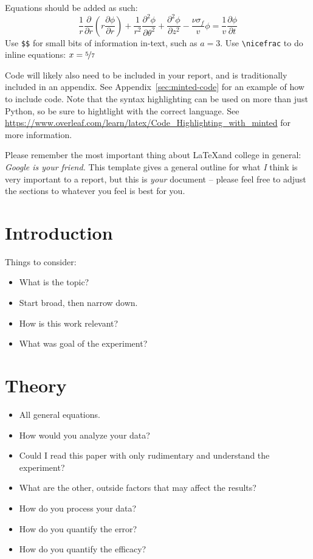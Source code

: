 \documentclass{juniorlabs}
\begin{document}
    Equations should be added as such:
    \begin{equation}
        \frac{1}{r}\frac{\partial}{\partial r}\left(r\frac{\partial\phi}{\partial r}\right) + \frac{1}{r^2}\frac{\partial^2\phi}{\partial\theta^2} + \frac{\partial^2\phi}{\partial z^2} - \frac{\nu\sigma_f}{v}\phi = \frac{1}{v}\frac{\partial\phi}{\partial t}
    \end{equation}
    Use \verb|$$| for small bits of information in-text, such as $a=3$.
    Use \verb|\nicefrac| to do inline equations: $x = \nicefrac{5}{7}$

    Code will likely also need to be included in your report, and is traditionally included in an appendix.
    See Appendix~\ref{sec:minted-code} for an example of how to include code.
    Note that the syntax highlighting can be used on more than just Python, so be sure to hightlight with the correct language.
    See \url{https://www.overleaf.com/learn/latex/Code_Highlighting_with_minted} for more information.

    Please remember the most important thing about \LaTeX and college in general: \emph{Google is your friend.}
    This template gives a general outline for what \emph{I} think is very important to a report, but this is \emph{your} document -- please feel free to adjust the sections to whatever you feel is best for you.


    \section{Introduction} \label{introduction}
    Things to consider:
    \begin{itemize}
        \item What is the topic?
        \item Start broad, then narrow down.
        \item How is this work relevant?
        \item What was goal of the experiment?
    \end{itemize}


    \section{Theory} \label{theory}
    \begin{itemize}
        \item All general equations.
        \item How would you analyze your data?
        \item Could I read this paper with only rudimentary and understand the experiment?
        \item What are the other, outside factors that may affect the results?
        \item How do you process your data?
        \item How do you quantify the error?
        \item How do you quantify the efficacy?
    \end{itemize}
\end{document}
